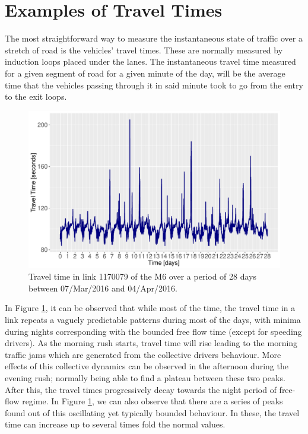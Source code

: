 \documentclass[a4paper, 10pt, conference]{ieeeconf}      %
\begin{document}
\section{Examples of Travel Times} \label{Examples of Travel Times}
The most straightforward way to measure the instantaneous state of traffic over a stretch of road is the vehicles' travel times. 
These are normally measured by induction loops placed under the lanes. 
The instantaneous travel time measured for a given segment of road for a given minute of the day, will be the average time that the vehicles passing through it in said minute took to go from the entry to the exit loops.
\begin{figure}[htbp]
\centerline{\includegraphics[width=\linewidth]{./images/Travel_Time.pdf}}
\caption{Travel time in link 1170079 of the M6 over a period of 28 days between 07/Mar/2016 and 04/Apr/2016.}
\label{fig:travel_time}
\end{figure}
In Figure \ref{fig:travel_time}, it can be observed that while most of the time, the travel time in a link repeats a vaguely predictable patterns during most of the days, with minima during nights corresponding with the bounded free flow time (except for speeding drivers).
As the morning rush starts, travel time will rise leading to the morning traffic jams which are generated from the collective drivers behaviour.
More effects of this collective dynamics can be observed in the afternoon during the evening rush; normally being able to find a plateau between these two peaks.
After this, the travel times progressively decay towards the night period of free-flow regime.
In Figure \ref{fig:travel_time}, we can also observe that there are a series of peaks found out of this oscillating yet typically bounded behaviour. 
In these, the travel time can increase up to several times fold the normal values.
\end{document}
